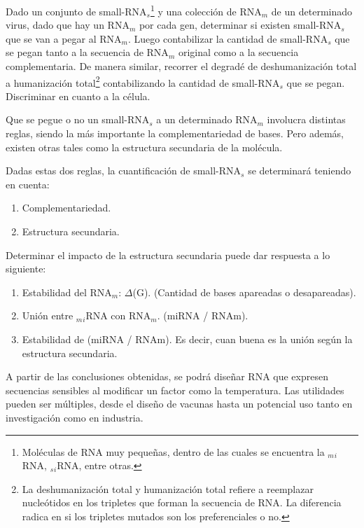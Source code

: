 \documentclass[12pt,a4paper]{article}
\begin{document}
\par Dado un conjunto de small-RNA$_s$\footnote{Moléculas de RNA muy pequeñas, dentro de las cuales se encuentra la $_m$$_i$RNA, $_s$$_i$RNA, entre otras.} y una colección de RNA$_m$ de un determinado virus, dado que hay un RNA$_m$ por cada gen, determinar si existen small-RNA$_s$ que se van a pegar al RNA$_m$. Luego contabilizar la cantidad de small-RNA$_s$ que se pegan tanto a la secuencia de RNA$_m$ original como a la secuencia complementaria. De manera similar, recorrer el degradé de deshumanización total a humanización total\footnote{La deshumanización total y humanización total refiere a reemplazar nucleótidos en los tripletes que forman la secuencia de RNA. La diferencia radica en si los tripletes mutados son los preferenciales o no.} contabilizando la cantidad de small-RNA$_s$ que se pegan. Discriminar en cuanto a la célula.

\par Que se pegue o no un small-RNA$_s$ a un determinado RNA$_m$ involucra distintas reglas, siendo la más importante la complementariedad de bases. Pero además, existen otras tales como la estructura secundaria de la molécula.

\par Dadas estas dos reglas, la cuantificación de small-RNA$_s$ se determinará teniendo en cuenta:
\begin{enumerate}
	\item Complementariedad.
	\item Estructura secundaria.
\end{enumerate}

Determinar el impacto de la estructura secundaria puede dar respuesta a lo siguiente:
\begin{enumerate}
	\item Estabilidad del RNA$_m$: $\Delta$(G). (Cantidad de bases apareadas o desapareadas).
	\item Unión entre $_m$$_i$RNA con RNA$_m$. (miRNA / RNAm).
	\item Estabilidad de (miRNA / RNAm). Es decir, cuan buena es la unión según la estructura secundaria.
\end{enumerate}

\par A partir de las conclusiones obtenidas, se podrá diseñar RNA que expresen secuencias sensibles al modificar un factor como la temperatura. Las utilidades pueden ser múltiples, desde el diseño de vacunas hasta un potencial uso tanto en investigación como en industria.	
\end{document}
